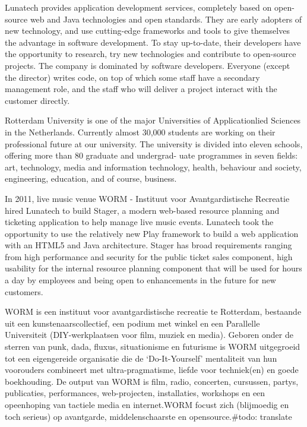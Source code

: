Lunatech provides application development services, completely based on open-source web and Java technologies and open standards. They are early adopters of new technology, and use cutting-edge frameworks and tools to give themselves the advantage in software development. To stay up-to-date, their developers have the opportunity to research, try new technologies and contribute to open-source projects. The company is dominated by software developers. Everyone (except the director) writes code, on top of which some staff have a secondary management role, and the staff who will deliver a project interact with the customer directly.

Rotterdam University is one of the major Universities of Applicationlied Sciences in the Netherlands. Currently almost 30,000 students are working on their professional future at our university.
The university is divided into eleven schools, offering more than 80 graduate and undergrad- uate programmes in seven fields: art, technology, media and information technology, health, behaviour and society, engineering, education, and of course, business.\cite{HogeschoolRotterdam2012}

In 2011, live music venue WORM - Instituut voor Avantgardistische Recreatie hired Lunatech to build Stager, a modern web-based resource planning and ticketing application to help manage live music events. Lunatech took the opportunity to use the relatively new Play framework to build a web application with an HTML5 and Java architecture. Stager has broad requirements ranging from high performance and security for the public ticket sales component, high usability for the internal resource planning component that will be used for hours a day by employees and being open to enhancements in the future for new customers.

WORM is een instituut voor avantgardistische recreatie te Rotterdam, bestaande uit een kunstenaarscollectief, een podium met winkel en een Parallelle Universiteit (DIY-werkplaatsen voor film, muziek en media). Geboren onder de sterren van punk, dada, fluxus, situationisme en futurisme is WORM uitgegroeid tot een eigengereide organisatie die de ‘Do-It-Yourself’ mentaliteit van hun voorouders combineert met ultra-pragmatisme, liefde voor techniek(en) en goede boekhouding. De output van WORM is film, radio, concerten, cursussen, partys, publicaties, performances, web-projecten, installaties, workshops en een opeenhoping van tactiele media en internet.WORM focust zich (blijmoedig en toch serieus) op avantgarde, middelenschaarste en opensource.\#todo: translate

